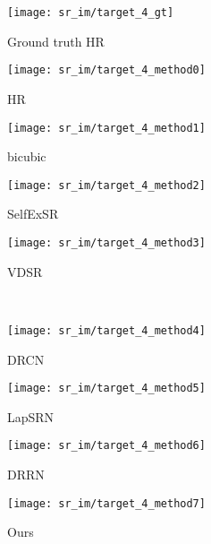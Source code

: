 \documentclass[10pt,twocolumn,letterpaper]{article}
\newcommand{\algname}{DSRN }
\begin{document}
\begin{figure*}[t!]
\begin{subfigure}{.24\textwidth}
\texttt{[image: sr\_im/target\_4\_gt]}
 \captionsetup{labelformat=empty,font=scriptsize,skip=2pt}
  \caption{Ground truth HR}
\end{subfigure}\hfill
\parbox{.74\textwidth}{
\begin{subfigure}{.24\linewidth}
\texttt{[image: sr\_im/target\_4\_method0]}
\captionsetup{labelformat=empty,font=scriptsize,skip=2pt}
\caption{HR}
\end{subfigure}
\begin{subfigure}{.24\linewidth}
\texttt{[image: sr\_im/target\_4\_method1]}
\captionsetup{labelformat=empty,font=scriptsize,skip=2pt}
\caption{bicubic}
\end{subfigure}
\begin{subfigure}{.24\linewidth}
\texttt{[image: sr\_im/target\_4\_method2]}
\captionsetup{labelformat=empty,font=scriptsize,skip=2pt}
\caption{SelfExSR\cite{huang2015single}}
\end{subfigure}
\begin{subfigure}{.24\linewidth}
\texttt{[image: sr\_im/target\_4\_method3]}
\captionsetup{labelformat=empty,font=scriptsize,skip=2pt}
\caption{VDSR\cite{kim2016accurate}}
\end{subfigure}\\
\begin{subfigure}{.24\linewidth}
\texttt{[image: sr\_im/target\_4\_method4]}
\captionsetup{labelformat=empty,font=scriptsize,skip=2pt}
\caption{DRCN\cite{kim2016deeply}}
\end{subfigure}
\begin{subfigure}{.24\linewidth}
\texttt{[image: sr\_im/target\_4\_method5]}
\captionsetup{labelformat=empty,font=scriptsize,skip=2pt}
\caption{LapSRN\cite{lai2017deep}}
\end{subfigure}
\begin{subfigure}{.24\linewidth}
\texttt{[image: sr\_im/target\_4\_method6]}
\captionsetup{labelformat=empty,font=scriptsize,skip=2pt}
\caption{DRRN\cite{tai2017image}}
\end{subfigure}
\begin{subfigure}{.24\linewidth}
\texttt{[image: sr\_im/target\_4\_method7]}
\captionsetup{labelformat=empty,font=scriptsize,skip=2pt}
\caption{Ours}
\end{subfigure}}
\captionsetup{skip=60pt}
\caption{Qualitative Comparison on Set 14 with  upscaling. From top to bottom: 
 1) the image "ppt3", \algname reconstructs sharp text with less artifacts. 2) the image "comic". 3) the image "monarch", \algname finds less blurry dots along the edge of the wing. 4) the image "baboon".}
\label{fig:qualitative}
\end{figure*} 
\end{document}
